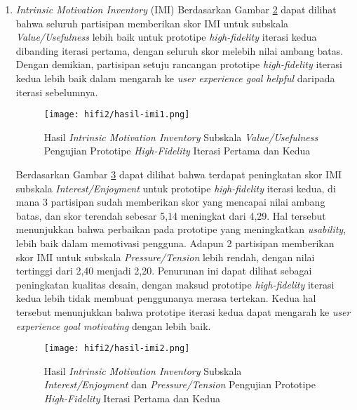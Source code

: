 \begin{enumerate}
  \begin{figure}[h]
    \centering
    \texttt{[image: hifi2/hasil-sus-utility.png]}
    \caption{Jawaban \textit{System Usability Scale} Pertanyaan Nomor 2, 3, dan 8 untuk Prototipe \textit{High-Fidelity} Iterasi Pertama}
    \label{img:sus_uti_2}
  \end{figure}
  \FloatBarrier

  \item \textit{Intrinsic Motivation Inventory} (IMI)
  \subitem  Berdasarkan Gambar \ref{img:imi1_2} dapat dilihat bahwa seluruh partisipan memberikan skor IMI untuk subskala \textit{Value/Usefulness} lebih baik untuk prototipe \textit{high-fidelity} iterasi kedua dibanding iterasi pertama, dengan seluruh skor melebih nilai ambang batas. Dengan demikian, partisipan setuju rancangan prototipe \textit{high-fidelity} iterasi kedua lebih baik dalam mengarah ke \textit{user experience goal helpful} daripada iterasi sebelumnya.
  
  \begin{figure}[h]
    \centering
    \texttt{[image: hifi2/hasil-imi1.png]}
    \caption{Hasil \textit{Intrinsic Motivation Inventory} Subskala \textit{Value/Usefulness} Pengujian Prototipe \textit{High-Fidelity} Iterasi Pertama dan Kedua}
    \label{img:imi1_2}
  \end{figure}
  \FloatBarrier
  
  \subitem  Berdasarkan Gambar \ref{img:imi2_2} dapat dilihat bahwa terdapat peningkatan skor IMI subskala \textit{Interest/Enjoyment} untuk prototipe \textit{high-fidelity} iterasi kedua, di mana 3 partisipan sudah memberikan skor yang mencapai nilai ambang batas, dan skor terendah sebesar 5,14 meningkat dari 4,29. Hal tersebut menunjukkan bahwa perbaikan pada prototipe yang meningkatkan \textit{usability}, lebih baik dalam memotivasi pengguna. Adapun 2 partisipan memberikan skor IMI untuk subskala \textit{Pressure/Tension} lebih rendah, dengan nilai tertinggi dari 2,40 menjadi 2,20. Penurunan ini dapat dilihat sebagai peningkatan kualitas desain, dengan maksud prototipe \textit{high-fidelity} iterasi kedua lebih tidak membuat penggunanya merasa tertekan. Kedua hal tersebut menunjukkan bahwa prototipe iterasi kedua dapat mengarah ke \textit{user experience goal motivating} dengan lebih baik.

  \begin{figure}[h]
    \centering
    \texttt{[image: hifi2/hasil-imi2.png]}
    \caption{Hasil \textit{Intrinsic Motivation Inventory} Subskala \textit{Interest/Enjoyment} dan \textit{Pressure/Tension} Pengujian Prototipe \textit{High-Fidelity} Iterasi Pertama dan Kedua}
    \label{img:imi2_2}
  \end{figure}
  \FloatBarrier

\end{enumerate}